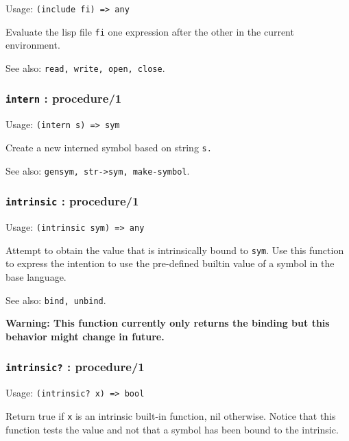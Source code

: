 \documentclass[
]{article}
\newcommand{\passthrough}[1]{#1}
\begin{document}
Usage: \passthrough{\lstinline!(include fi) => any!}

Evaluate the lisp file \passthrough{\lstinline!fi!} one expression after
the other in the current environment.

See also: \passthrough{\lstinline!read, write, open, close!}.

\hypertarget{intern-procedure1}{%
\subsubsection{\texorpdfstring{\texttt{intern} :
procedure/1}{intern : procedure/1}}\label{intern-procedure1}}

Usage: \passthrough{\lstinline!(intern s) => sym!}

Create a new interned symbol based on string
\passthrough{\lstinline!s.!}

See also: \passthrough{\lstinline!gensym, str->sym, make-symbol!}.

\hypertarget{intrinsic-procedure1}{%
\subsubsection{\texorpdfstring{\texttt{intrinsic} :
procedure/1}{intrinsic : procedure/1}}\label{intrinsic-procedure1}}

Usage: \passthrough{\lstinline!(intrinsic sym) => any!}

Attempt to obtain the value that is intrinsically bound to
\passthrough{\lstinline!sym!}. Use this function to express the
intention to use the pre-defined builtin value of a symbol in the base
language.

See also: \passthrough{\lstinline!bind, unbind!}.

\textbf{Warning: This function currently only returns the binding but
this behavior might change in future.}

\hypertarget{intrinsic-procedure1-1}{%
\subsubsection{\texorpdfstring{\texttt{intrinsic?} :
procedure/1}{intrinsic? : procedure/1}}\label{intrinsic-procedure1-1}}

Usage: \passthrough{\lstinline!(intrinsic? x) => bool!}

Return true if \passthrough{\lstinline!x!} is an intrinsic built-in
function, nil otherwise. Notice that this function tests the value and
not that a symbol has been bound to the intrinsic.
\end{document}
